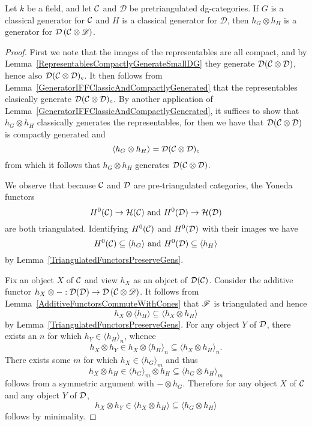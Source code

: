 \documentclass[dissertation.tex]{subfiles}
\begin{document}
\begin{thm}
  Let $k$ be a field, and let $\mathcal{C}$ and $\mathscr{D}$ be pretriangulated dg-categories.
  If $G$ is a classical generator for $\mathcal{C}$ and $H$ is a classical generator for $\mathscr{D}$, then $h_G \otimes h_H$ is a generator for $\mathcal{D}\left(\mathcal{C} \otimes \mathscr{D}\right)$.
  
  \begin{proof}
    First we note that the images of the representables are all compact, and by Lemma~\ref{RepresentablesCompactlyGenerateSmallDG} they generate $\mathcal{D}(\mathcal{C} \otimes \mathcal{D})$, hence also $\mathcal{D}(\mathcal{C} \otimes \mathcal{D})_c$.
    It then follows from Lemma~\ref{GeneratorIFFClassicAndCompactlyGenerated} that the representables clasically generate $\mathcal{D}(\mathcal{C} \otimes \mathcal{D})_c$.
    By another application of Lemma~\ref{GeneratorIFFClassicAndCompactlyGenerated}, it suffices to show that $h_G \otimes h_H$ classically generates the representables, for then we have that $\mathcal{D}(\mathcal{C} \otimes \mathcal{D})$ is compactly generated and 
    $$\langle h_G \otimes h_H \rangle = \mathcal{D}(\mathcal{C} \otimes \mathcal{D})_c$$
    from which it follows that $h_G \otimes h_H$ generates $\mathcal{D}(\mathcal{C} \otimes \mathcal{D})$.
    
    We observe that because $\mathcal{C}$ and $\mathcal{D}$ are pre-triangulated categories, the Yoneda functors
    $$H^0(\mathcal{C}) \to \mathcal{H}(\mathcal{C})\ \text{and}\ H^0(\mathcal{D}) \to \mathcal{H}(\mathcal{D})$$
    are both triangulated.
    Identifying $H^0(\mathcal{C})$ and $H^0(\mathcal{D})$ with their images we have
    $$H^0(\C) \subseteq \langle h_G \rangle\ \text{and}\ H^0(\D) \subseteq \langle h_H \rangle$$
    by Lemma~\ref{TriangulatedFunctorsPreserveGens}.
    
    Fix an object $X$ of $\mathcal{C}$ and view $h_X$ as an object of $\mathcal{D}(\mathcal{C})$.
    Consider the additive functor $h_X \otimes -: \mathcal{D}(\mathcal{D}) \to \mathcal{D}\left(\mathcal{C} \otimes \mathscr{D}\right)$. %
    It follows from Lemma~\ref{AdditiveFunctorsCommuteWithCones} that $\mathscr{F}$ is triangulated and hence 
    $$h_X \otimes \langle h_H \rangle \subseteq \langle h_X \otimes h_H \rangle$$
    by Lemma~\ref{TriangulatedFunctorsPreserveGens}.
    For any object $Y$ of $\mathcal{D}$, there exists an $n$ for which $h_Y \in \langle h_H \rangle_n$, whence
    $$h_X \otimes h_Y \in h_X \otimes \langle h_H\rangle_n \subseteq \langle h_X \otimes h_H\rangle_n.$$
    There exists some $m$ for which $h_X \in \langle h_G \rangle_m$ and thus
    $$h_X \otimes h_H \in \langle h_G \rangle_m \otimes h_H \subseteq \langle h_G \otimes h_H \rangle_m$$
    follows from a symmetric argument with $- \otimes h_G$.
    Therefore for any object $X$ of $\mathcal{C}$ and any object $Y$ of $\mathcal{D}$,
    $$h_X \otimes h_Y \in \langle h_X \otimes h_H \rangle \subseteq \langle h_G \otimes h_H\rangle$$
    follows by minimality.
  \end{proof}
\end{thm}
\end{document}

